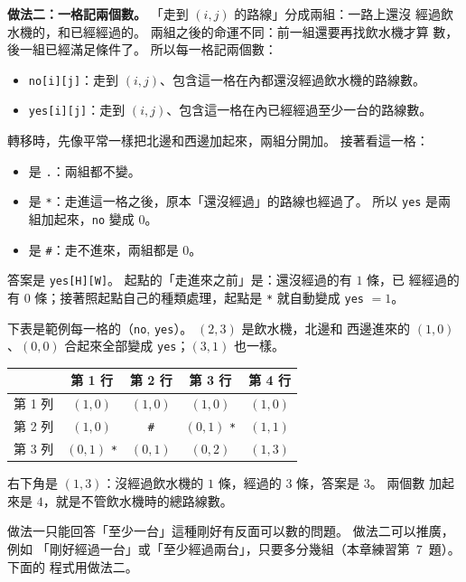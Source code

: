 \textbf{做法二：一格記兩個數。} 「走到 $(i, j)$ 的路線」分成兩組：一路上還沒
經過飲水機的，和已經經過的。 兩組之後的命運不同：前一組還要再找飲水機才算
數，後一組已經滿足條件了。 所以每一格記兩個數：

\begin{itemize}
\item \texttt{no[i][j]}：走到 $(i, j)$、包含這一格在內都還沒經過飲水機的路線數。
\item \texttt{yes[i][j]}：走到 $(i, j)$、包含這一格在內已經經過至少一台的路線數。
\end{itemize}

轉移時，先像平常一樣把北邊和西邊加起來，兩組分開加。 接著看這一格：

\begin{itemize}
\item 是 \texttt{.}：兩組都不變。
\item 是 \texttt{*}：走進這一格之後，原本「還沒經過」的路線也經過了。 所以
\texttt{yes} 是兩組加起來，\texttt{no} 變成 $0$。
\item 是 \texttt{\#}：走不進來，兩組都是 $0$。
\end{itemize}

答案是 \texttt{yes[H][W]}。 起點的「走進來之前」是：還沒經過的有 $1$ 條，已
經經過的有 $0$ 條；接著照起點自己的種類處理，起點是 \texttt{*} 就自動變成
\texttt{yes} $= 1$。

下表是範例每一格的（\texttt{no}, \texttt{yes}）。 $(2, 3)$ 是飲水機，北邊和
西邊進來的 $(1, 0)$、$(0, 0)$ 合起來全部變成 \texttt{yes}；$(3, 1)$ 也一樣。

\begin{center}
\begin{tabular}{c|cccc}
\toprule
 & 第 1 行 & 第 2 行 & 第 3 行 & 第 4 行 \\
\midrule
第 1 列 & $(1, 0)$ & $(1, 0)$ & $(1, 0)$ & $(1, 0)$ \\
第 2 列 & $(1, 0)$ & \texttt{\#} & $(0, 1)$ \texttt{*} & $(1, 1)$ \\
第 3 列 & $(0, 1)$ \texttt{*} & $(0, 1)$ & $(0, 2)$ & $(1, 3)$ \\
\bottomrule
\end{tabular}
\end{center}

右下角是 $(1, 3)$：沒經過飲水機的 $1$ 條，經過的 $3$ 條，答案是 $3$。 兩個數
加起來是 $4$，就是不管飲水機時的總路線數。

做法一只能回答「至少一台」這種剛好有反面可以數的問題。 做法二可以推廣，例如
「剛好經過一台」或「至少經過兩台」，只要多分幾組（本章練習第~7~題）。 下面的
程式用做法二。

